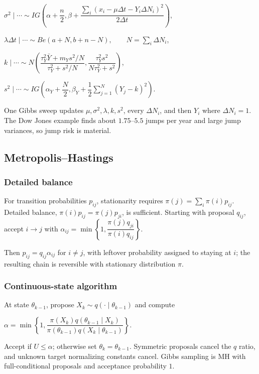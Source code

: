 $\sigma^2\mid\cdots\sim IG\left(\alpha+\dfrac n2,\beta+\dfrac{\sum_i(x_i-\mu\Delta t-Y_i\Delta N_i)^2}{2\Delta t}\right)$,

$\lambda\Delta t\mid\cdots\sim Be(a+N,b+n-N),\qquad N=\sum_i\Delta N_i$,

$k\mid\cdots\sim N\left(\dfrac{\tau_Y^2\bar Y+m_Ys^2/N}{\tau_Y^2+s^2/N},\dfrac{\tau_Y^2s^2}{N\tau_Y^2+s^2}\right)$,

$s^2\mid\cdots\sim IG\left(\alpha_Y+\dfrac N2,\beta_Y+\dfrac12\sum_{j=1}^N(Y_j-k)^2\right)$.

One Gibbs sweep updates $\mu,\sigma^2,\lambda,k,s^2$, every $\Delta N_i$, and then $Y_i$ where $\Delta N_i=1$. The Dow Jones example finds about $1.75$--$5.5$ jumps per year and large jump variances, so jump risk is material.

\subsection{Metropolis--Hastings}

\subsubsection*{Detailed balance}

For transition probabilities $p_{ij}$, stationarity requires $\pi(j)=\sum_i\pi(i)p_{ij}$. Detailed balance,
$\pi(i)p_{ij}=\pi(j)p_{ji}$,
is sufficient. Starting with proposal $q_{ij}$, accept $i\to j$ with
$\alpha_{ij}=\min\left\{1,\dfrac{\pi(j)q_{ji}}{\pi(i)q_{ij}}\right\}$.

Then $p_{ij}=q_{ij}\alpha_{ij}$ for $i\ne j$, with leftover probability assigned to staying at $i$; the resulting chain is reversible with stationary distribution $\pi$.

\subsubsection*{Continuous-state algorithm}

At state $\theta_{k-1}$, propose $X_k\sim q(\cdot\mid\theta_{k-1})$ and compute

$\alpha=\min\left\{1,\dfrac{\pi(X_k)q(\theta_{k-1}\mid X_k)}{\pi(\theta_{k-1})q(X_k\mid\theta_{k-1})}\right\}$.

Accept if $U\le\alpha$; otherwise set $\theta_k=\theta_{k-1}$. Symmetric proposals cancel the $q$ ratio, and unknown target normalizing constants cancel. Gibbs sampling is MH with full-conditional proposals and acceptance probability $1$.

